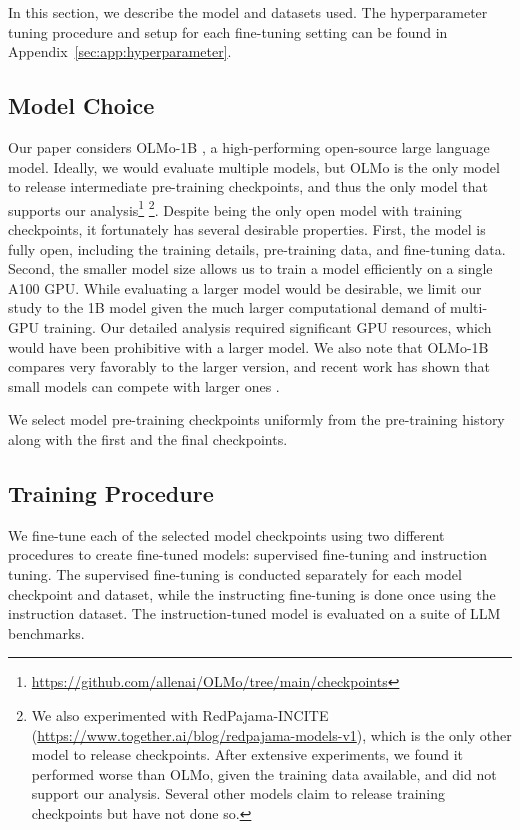 In this section, we describe the model and datasets used. 
The hyperparameter tuning procedure and setup for each fine-tuning setting can be found in Appendix~\ref{sec:app:hyperparameter}.

\subsection{Model Choice} 
Our paper considers OLMo-1B \cite{groeneveld2024olmo}, a high-performing open-source large language model. 
Ideally, we would evaluate multiple models, but OLMo is the only model to release intermediate pre-training checkpoints, and thus the only model that supports our analysis\footnote{\href{https://github.com/allenai/OLMo/tree/main/checkpoints/official}{https://github.com/allenai/OLMo/tree/main/checkpoints}} \footnote{We also experimented with RedPajama-INCITE (\href{https://www.together.ai/blog/redpajama-models-v1}{https://www.together.ai/blog/redpajama-models-v1}), which is the only other model to release checkpoints. After extensive experiments, we found it performed worse than OLMo, given the training data available, and did not support our analysis. Several other models claim to release training checkpoints but have not done so.}.
Despite being the only open model with training checkpoints, it fortunately has several desirable properties. First, 
the model is fully open, including the training details, pre-training data, and fine-tuning data. 
Second, the smaller model size allows us to train a model efficiently on a single A100 GPU. While evaluating a larger model would be desirable, we limit our study to the 1B model given the much larger computational demand of multi-GPU training. Our detailed analysis required significant GPU resources, which would have been prohibitive with a larger model.
We also note that OLMo-1B compares very favorably to the larger version, and recent work has shown that small models can compete with larger ones \cite{team2024gemma}.

We select model pre-training checkpoints uniformly from the pre-training history along with the first and the final checkpoints.

\subsection{Training Procedure}
We fine-tune each of the selected model checkpoints using two different procedures to create fine-tuned models: supervised fine-tuning and instruction tuning. 
The supervised fine-tuning is conducted separately for each model checkpoint and dataset, while the instructing fine-tuning is done once using the instruction dataset.
The instruction-tuned model is evaluated on a suite of LLM benchmarks.

